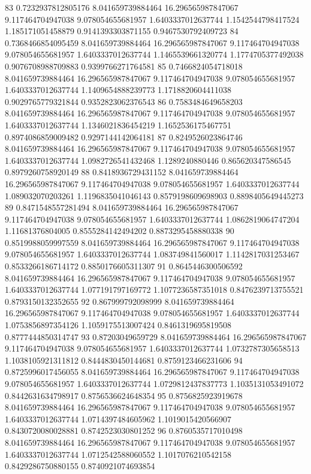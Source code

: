 {83 0.7232937812805176 8.041659739884464 16.296565987847067 9.117464704947038 9.078054655681957 1.6403337012637744 1.1542544798417524 1.185171051458879 0.9141393303871155 0.9467530792409723
84 0.7368466854095459 8.041659739884464 16.296565987847067 9.117464704947038 9.078054655681957 1.6403337012637744 1.1465539661320774 1.1774705377492038 0.9076708988709883 0.9399766271764581
85 0.7466824054718018 8.041659739884464 16.296565987847067 9.117464704947038 9.078054655681957 1.6403337012637744 1.1409654888239773 1.1718820604411038 0.9029765779321844 0.9352823062376543
86 0.7583484649658203 8.041659739884464 16.296565987847067 9.117464704947038 9.078054655681957 1.6403337012637744 1.1346021836454219 1.1652536175467751 0.8974086859009482 0.9297144142064181
87 0.8249526023864746 8.041659739884464 16.296565987847067 9.117464704947038 9.078054655681957 1.6403337012637744 1.0982726541432468 1.1289240880446 0.865620347586545 0.8979260758920149
88 0.8418936729431152 8.041659739884464 16.296565987847067 9.117464704947038 9.078054655681957 1.6403337012637744 1.089032070203261 1.1196835041046143 0.8579198609698903 0.8898405649445273
89 0.8471548557281494 8.041659739884464 16.296565987847067 9.117464704947038 9.078054655681957 1.6403337012637744 1.0862819064747204 1.11681376804005 0.8555284142494202 0.8873295458880338
90 0.8519988059997559 8.041659739884464 16.296565987847067 9.117464704947038 9.078054655681957 1.6403337012637744 1.083749841560017 1.1142817031253467 0.8533266186714172 0.8850176605311307
91 0.8645446300506592 8.041659739884464 16.296565987847067 9.117464704947038 9.078054655681957 1.6403337012637744 1.077191797169772 1.1077236587351018 0.8476239713755521 0.8793150132352655
92 0.867999792098999 8.041659739884464 16.296565987847067 9.117464704947038 9.078054655681957 1.6403337012637744 1.0753856897354126 1.1059175513007424 0.8461319695819508 0.8777444850314747
93 0.87203049659729 8.041659739884464 16.296565987847067 9.117464704947038 9.078054655681957 1.6403337012637744 1.0732787305658513 1.1038105921311812 0.8444830450144681 0.8759123466231606
94 0.8725996017456055 8.041659739884464 16.296565987847067 9.117464704947038 9.078054655681957 1.6403337012637744 1.0729812437837773 1.1035131053491072 0.8442631634798917 0.8756536624648354
95 0.8756825923919678 8.041659739884464 16.296565987847067 9.117464704947038 9.078054655681957 1.6403337012637744 1.0714397484605962 1.1019015420566907 0.8430720080028881 0.8742523030801252
96 0.8760535717010498 8.041659739884464 16.296565987847067 9.117464704947038 9.078054655681957 1.6403337012637744 1.0712542588060552 1.1017076210542158 0.8429286750880155 0.8740921074693854
}
